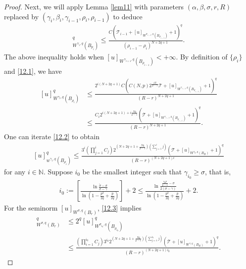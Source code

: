 \documentclass[10pt,a4paper]{amsart}
\begin{document}
\begin{proof}
	Next, we will apply Lemma \ref{lem11} with parameters $(\alpha, \beta, \sigma, r, R)$ replaced by $\left(\gamma_i, \beta_i, \gamma_{i-1}, \rho_i, \rho_{i-1}\right)$ to deduce
	\begin{align*}
		[u]_{W^{\gamma_i ,q}\left(B_{p_i}\right)}^q \leq \frac{C\left(\mathcal{T}_{i-1}+[u]_{W^{\sigma_{i-1}, q}\left(B_{\rho_{i-1}}\right)}+1\right)^q}{\left(\rho_{i-1}-\rho_i\right)^{N+2 q+1}} .
	\end{align*}
	The above inequality holds when $[u]_{W^{\gamma_ {i+1}, q}{\left(B_{\rho_{i-1}}\right)}}<+\infty$.
	By definition of $\{\rho_i\}$ and \eqref{12.1}, we have 
	\begin{align}\label{12.2}
		[u]_{W^{\gamma_i,q }\left(B_{\rho_i}\right)} ^q &\leq \frac{2^{i(N+2q+1)}C\left(C(N, p) 2^{\frac{i N}{p-1}} \mathcal{T}+[u]_{W^{\gamma_{i-1}, q}\left(B_{\rho_{i-1}}\right)}+1\right)^q}{(R-r)^{N+2q+1}} \nonumber\\
		&\leq \frac{C_i 2^{i(N+2q+1)+i\frac{Nq}{p-1}}\left(\mathcal{T}+[u] _{W^{\gamma_{i-1},q}\left(B_{\rho_{i-1}}\right)}+1\right)^q}{(R-r)^{N+2q+1}} .
	\end{align}
	One can iterate \eqref{12.2} to obtain 
	\begin{align}\label{12.3}
		[u]^q_{w^{\gamma_i, q}\left(B_{\rho_i}\right)} \leq \frac{3^{i}\left(\prod\limits_{j=1}^i C_j\right)  2^{\left(N+2q+1+\frac{Nq}{p-1}\right)\left(\sum\limits_{j=1}^i j\right)}\left(\mathcal{T}+[u]_{W^{\gamma_0, q}\left(B_R\right)}+1\right)^q}{(R-r)^{(N+2q+1)i}}
	\end{align}
	for any $i\in \mathbb{N}$. Suppose $i_0$ be the smallest integer such that $\gamma_{i_0} \geq \sigma$, that is,
	\begin{align*}
		i_0:=\left[\frac{\ln \frac{\tilde{\sigma}-\sigma}{\sigma-\gamma}}{\ln \left(1-\frac{p^2}{2 q}+\frac{p}{2 q}\right)}\right]+2 \leq \frac{\ln \frac{\frac{s_p p}{p-1}-\sigma}{2(\sigma-\gamma)}}{\ln \left(1-\frac{p^2}{2 q}+\frac{p}{2 q}\right)}+2 .
	\end{align*}
	For the seminorm $[u]_{W^{\sigma, q}\left(B_r\right)}$, \eqref{12.3} implies 
	\begin{align*}
		[u]_{W^{\sigma, q}\left(B_r\right)}^q &\leq 2^q[u]_{W^{\sigma_{i_0}, q}\left(B_{\rho_{i_0}}\right)}^q \\
		& \leq \frac{\left(\prod\limits_{i=1}^{i_0} C_j\right) 3^{i_0} 2^{\left(N+2q+1+\frac{Nq}{p-1}\right)\left(\sum\limits_{j=1}^{i_0} j\right)}\left(\mathcal{T}+[u]_{W^{\gamma, q}\left(B_R\right)}+1\right)^q}{(R-r)^{(N+2q+1) i_0}} .
	\end{align*}

\end{proof}
\end{document}
